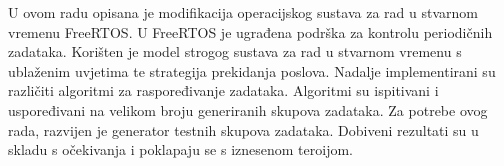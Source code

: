 \documentclass[times, utf8, zavrsni, numeric]{fer}
\begin{document}
\begin{sazetak}
U ovom radu opisana je modifikacija operacijskog sustava za rad u stvarnom vremenu FreeRTOS.
U FreeRTOS je ugrađena podrška za kontrolu periodičnih zadataka. Korišten je model strogog sustava za rad u stvarnom vremenu 
s ublaženim uvjetima te strategija prekidanja poslova.
Nadalje implementirani su različiti algoritmi za raspoređivanje zadataka. Algoritmi su ispitivani i uspoređivani na velikom 
broju generiranih skupova zadataka. Za potrebe ovog rada, razvijen je generator testnih skupova zadataka. 
Dobiveni rezultati su u skladu s očekivanja i poklapaju se s iznesenom teroijom. 

\end{sazetak}




\end{document}
